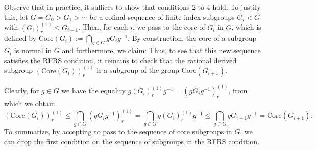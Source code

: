 Observe that in practice, it suffices to show that conditions \(2\) to \(4\) hold. %
To justify this, let \(G = G_0 > G_1 > \cdots\) be a cofinal sequence of finite index subgroups \(G_i < G\) with \((G_i)_r^{(1)} \leq G_{i+1}\).
Then, for each \(i\), we pass to the core of \(G_i\) in \(G\), which is defined by Core\((G_i) := \bigcap_{g \in G} g G_i g^{-1}\).
By construction, the core of a subgroup \(G_i\) is normal in \(G\) and furthermore, we claim: %
Thus, to see that this new sequence satisfies the RFRS condition, it remains to check that the rational derived subgroup \((\text{Core}(G_i))_r^{(1)}\) is a subgroup of the group Core\((G_{i+1})\).

\noindent
Clearly, for \(g \in G\) we have the equality \(g(G_i)_r^{(1)}g^{-1} = (gG_ig^{-1})_r^{(1)}\), from which we obtain
\[(\text{Core}(G_i))_r^{(1)} \leq \bigcap_{g \in G} (gG_ig^{-1})_r^{(1)} = \bigcap_{g \in G} g(G_i)_r^{(1)}g^{-1} \leq \bigcap_{g \in G} gG_{i+1}g^{-1} = \text{Core}(G_{i+1}).\]
To summarize, by accepting to pass to the sequence of core subgroups in \(G\), we can drop the first condition on the sequence of subgroups in the RFRS condition.

